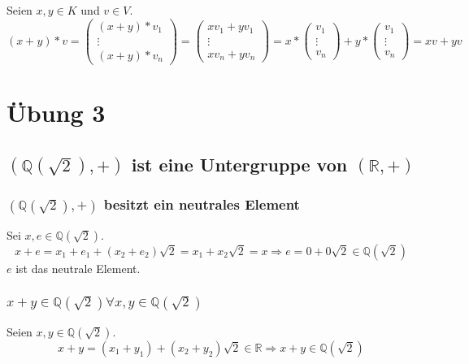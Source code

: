 \documentclass[a4paper,10pt]{article}
\begin{document}
Seien $x, y \in K$ und $v \in V$.
\begin{equation*}
 (x + y) * v = \begin{pmatrix}(x + y) * v_1 \\ \vdots \\ (x + y) * v_n \end{pmatrix} = \begin{pmatrix} xv_1 + yv_1 \\ \vdots \\ xv_n + yv_n \end{pmatrix} = x * \begin{pmatrix}v_1 \\ \vdots \\ v_n \end{pmatrix} + y * \begin{pmatrix}v_1 \\ \vdots \\ v_n \end{pmatrix} = xv + yv
\end{equation*}

\section*{Übung 3}

\subsection*{$(\mathbb{Q}(\sqrt{2}), +)$ ist eine Untergruppe von $(\mathbb{R}, +)$}

\subsubsection*{$(\mathbb{Q}(\sqrt{2}), +)$ besitzt ein neutrales Element}

Sei $x, e \in \mathbb{Q}(\sqrt{2})$.
\begin{equation*}
 x + e = x_1 + e_1 + (x_2 + e_2)\sqrt{2} = x_1 + x_2\sqrt{2} = x \Rightarrow e = 0 + 0\sqrt{2} \in \mathbb{Q}(\sqrt{2})
\end{equation*}
$e$ ist das neutrale Element.

\subsubsection*{$x + y \in \mathbb{Q}(\sqrt{2}) \forall x, y \in \mathbb{Q}(\sqrt{2})$}

Seien $x, y \in \mathbb{Q}(\sqrt{2})$.
\begin{equation*}
 x + y = (x_1 + y_1) + (x_2 + y_2)\sqrt{2} \in \mathbb{R} \Rightarrow x + y \in \mathbb{Q}(\sqrt{2})
\end{equation*}
\end{document}
